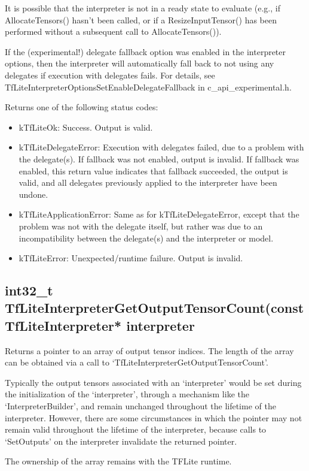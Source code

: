\documentclass{ol-softwaremanual}
\begin{document}
It is possible that the interpreter is not in a ready state to evaluate (e.g., if AllocateTensors() hasn't been called, or if a ResizeInputTensor() has been performed without a subsequent call to AllocateTensors()).

If the (experimental!) delegate fallback option was enabled in the interpreter options, then the interpreter will automatically fall back to not using any delegates if execution with delegates fails. For details, see TfLiteInterpreterOptionsSetEnableDelegateFallback in c\_api\_experimental.h.

Returns one of the following status codes:
\begin{itemize}
    \item kTfLiteOk: Success. Output is valid.
    \item kTfLiteDelegateError: Execution with delegates failed, due to a problem with the delegate(s). If fallback was not enabled, output is invalid. If fallback was enabled, this return value indicates that fallback succeeded, the output is valid, and all delegates previously applied to the interpreter have been undone.
    \item kTfLiteApplicationError: Same as for kTfLiteDelegateError, except that the problem was not with the delegate itself, but rather was due to an incompatibility between the delegate(s) and the interpreter or model.
    \item kTfLiteError: Unexpected/runtime failure. Output is invalid.
\end{itemize}

\subsection{int32\_t TfLiteInterpreterGetOutputTensorCount(const TfLiteInterpreter* interpreter}

Returns a pointer to an array of output tensor indices. The length of the array can be obtained via a call to `TfLiteInterpreterGetOutputTensorCount'.

Typically the output tensors associated with an `interpreter' would be set during the initialization of the `interpreter', through a mechanism like the `InterpreterBuilder', and remain unchanged throughout the lifetime of the interpreter.  However, there are some circumstances in which the pointer may not remain valid throughout the lifetime of the interpreter, because calls to `SetOutputs' on the interpreter invalidate the returned pointer.

The ownership of the array remains with the TFLite runtime.
    
\end{document}
